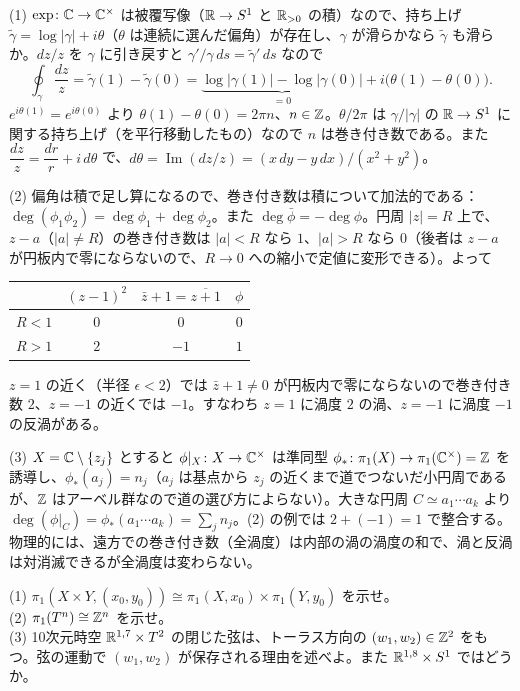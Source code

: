 \begin{solution}
(1) $\exp\colon\mathbb{C}\to\mathbb{C}^\times$ は被覆写像（$\mathbb{R}\to S^1$ と $\mathbb{R}_{>0}$ の積）なので、持ち上げ $\tilde\gamma=\log\lvert\gamma\rvert+i\theta$（$\theta$ は連続に選んだ偏角）が存在し、$\gamma$ が滑らかなら $\tilde\gamma$ も滑らか。$dz/z$ を $\gamma$ に引き戻すと $\gamma'/\gamma\,ds=\tilde\gamma'\,ds$ なので
\[
\oint_\gamma\frac{dz}{z}=\tilde\gamma(1)-\tilde\gamma(0)=\underbrace{\log\lvert\gamma(1)\rvert-\log\lvert\gamma(0)\rvert}_{=0}+i\bigl(\theta(1)-\theta(0)\bigr).
\]
$e^{i\theta(1)}=e^{i\theta(0)}$ より $\theta(1)-\theta(0)=2\pi n$、$n\in\mathbb{Z}$。$\theta/2\pi$ は $\gamma/\lvert\gamma\rvert$ の $\mathbb{R}\to S^1$ に関する持ち上げ（を平行移動したもの）なので $n$ は巻き付き数である。また $\dfrac{dz}{z}=\dfrac{dr}{r}+i\,d\theta$ で、$d\theta=\operatorname{Im}(dz/z)=(x\,dy-y\,dx)/(x^2+y^2)$。

(2) 偏角は積で足し算になるので、巻き付き数は積について加法的である：$\deg(\phi_1\phi_2)=\deg\phi_1+\deg\phi_2$。また $\deg\bar\phi=-\deg\phi$。円周 $\lvert z\rvert=R$ 上で、$z-a$（$\lvert a\rvert\ne R$）の巻き付き数は $\lvert a\rvert<R$ なら $1$、$\lvert a\rvert>R$ なら $0$（後者は $z-a$ が円板内で零にならないので、$R\to0$ への縮小で定値に変形できる）。よって
\begin{center}
\begin{tabular}{c|ccc}
 & $(z-1)^2$ & $\bar z+1=\overline{z+1}$ & $\phi$\\ \hline
$R<1$ & $0$ & $0$ & $0$\\
$R>1$ & $2$ & $-1$ & $1$
\end{tabular}
\end{center}
$z=1$ の近く（半径 $\epsilon<2$）では $\bar z+1\neq0$ が円板内で零にならないので巻き付き数 $2$、$z=-1$ の近くでは $-1$。すなわち $z=1$ に渦度 $2$ の渦、$z=-1$ に渦度 $-1$ の反渦がある。

(3) $X=\mathbb{C}\setminus\{z_j\}$ とすると $\phi|_X\colon X\to\mathbb{C}^\times$ は準同型 $\phi_*\colon\pi_1(X)\to\pi_1(\mathbb{C}^\times)=\mathbb{Z}$ を誘導し、$\phi_*(a_j)=n_j$（$a_j$ は基点から $z_j$ の近くまで道でつないだ小円周であるが、$\mathbb{Z}$ はアーベル群なので道の選び方によらない）。大きな円周 $C\simeq a_1\cdots a_k$ より $\deg(\phi|_C)=\phi_*(a_1\cdots a_k)=\sum_jn_j$。(2) の例では $2+(-1)=1$ で整合する。物理的には、遠方での巻き付き数（全渦度）は内部の渦の渦度の和で、渦と反渦は対消滅できるが全渦度は変わらない。
\end{solution}

\begin{problem}[難易度 A]\label{ch02-prob-product}
(1) $\pi_1(X\times Y,(x_0,y_0))\cong\pi_1(X,x_0)\times\pi_1(Y,y_0)$ を示せ。\\
(2) $\pi_1(T^n)\cong\mathbb{Z}^n$ を示せ。\\
(3) 10次元時空 $\mathbb{R}^{1,7}\times T^2$ の閉じた弦は、トーラス方向の $(w_1,w_2)\in\mathbb{Z}^2$ をもつ。弦の運動で $(w_1,w_2)$ が保存される理由を述べよ。また $\mathbb{R}^{1,8}\times S^1$ ではどうか。
\end{problem}

